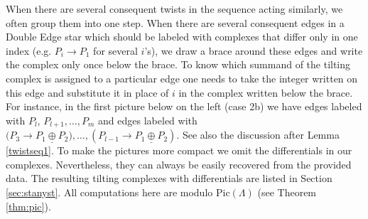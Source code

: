 \documentclass[12pt]{amsart}
\theoremstyle{plain}
\theoremstyle{remark}
\theoremstyle{definition}
\newcommand{\Pic}{{\mathrm{Pic}}}
\begin{document}
When there are several consequent twists in the sequence acting similarly, we often group them into one step. When there are several consequent edges in a Double Edge star which should be labeled with complexes that differ only in one index (e.g. $P_i \to P_1$ for several $i$'s), we draw a brace around these edges and write the complex only once below the brace. To know which summand of the tilting complex is assigned to a particular edge one needs to take the integer written on this edge and substitute it in place of $i$ in the complex written below the brace. For instance, in the first picture below on the left (case 2b) we have edges labeled with $P_l$, $P_{l+1}, \dots, P_m$ and edges labeled with $({P_3 \xrightarrow{} \underline{P_1 \oplus P_2}), \dots, (P_{l-1} \xrightarrow{} \underline{P_1 \oplus P_2})}$. See also the discussion after Lemma \ref{twistseq1}. To make the pictures more compact we omit the differentials in our complexes. Nevertheless, they can always be easily recovered from the provided data. The resulting tilting complexes with differentials are listed in Section \ref{sec:stanyst}. All computations here are modulo $\Pic(\Lambda)$ (see Theorem \ref{thm:pic}).
\end{document}

